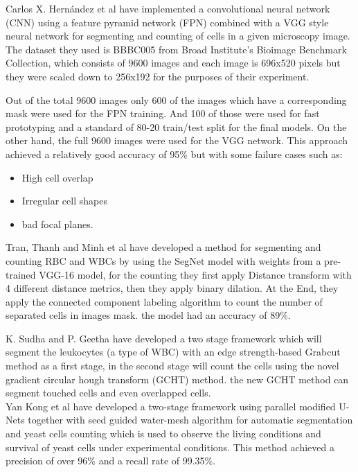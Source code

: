 Carlos X. Hern{\'{a}}ndez et al \textsuperscript{\cite{DBLP:journals/corr/abs-1802-10548}} have implemented a convolutional neural network (CNN) using a feature pyramid network (FPN) combined with a VGG style neural network for segmenting and counting of cells in a given microscopy image.
The dataset they used is BBBC005 from Broad Institute's Bioimage Benchmark Collection, which consists of 9600 images and each image is 696x520 pixels but they were scaled down to 256x192 for the purposes of their experiment.

\newpage

Out of the total 9600 images only 600 of the images which have a corresponding mask were used for the FPN training. And 100 of those were used for fast prototyping and a standard of 80-20 train/test split for the final models.
On the other hand, the full 9600 images were used for the VGG network.
This approach achieved a relatively good accuracy of 95\% but with some failure cases such as:

\begin{itemize}
  \item High cell overlap
  \item Irregular cell shapes
  \item bad focal planes.
\end{itemize}

Tran, Thanh and Minh et al \textsuperscript{\cite{DBLP:journals/corr/abs-1802-10548}} have developed a method for segmenting and counting RBC and WBCs by using the SegNet model with weights from a pre-trained VGG-16 model, for the counting they first apply Distance transform with 4 different distance metrics, then they apply binary dilation. At the End, they apply the connected component labeling algorithm to count the number of separated cells in images mask. the model had an accuracy of 89\%.

K. Sudha and P. Geetha \textsuperscript{\cite{SUDHA2020639}} have developed a two stage framework which will segment the leukocytes (a type of WBC) with an edge strength-based Grabcut method as a first stage, in the second stage will count the cells using the novel gradient circular hough transform (GCHT) method. the new GCHT method can segment touched cells and even overlapped cells.\\

Yan Kong et al \textsuperscript{\cite{Kong:20}} have developed a two-stage framework using parallel modified U-Nets together with seed guided water-mesh algorithm for automatic segmentation and yeast cells counting which is used to observe the living conditions and survival of yeast cells under experimental conditions. This method achieved a precision of over 96\% and a recall rate of 99.35\%.\\

